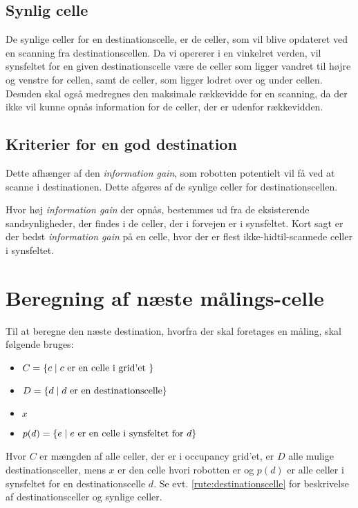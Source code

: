 \subsection{Synlig celle}\label{rute:synligcelle}
De synlige celler for en destinationscelle, er de celler, som vil blive opdateret ved en scanning fra destinationscellen.
Da vi opererer i en vinkelret verden, vil synsfeltet for en given destinationscelle være de celler som ligger vandret til højre og venstre for cellen, samt de celler, som ligger lodret over og under cellen.
Desuden skal også medregnes den maksimale rækkevidde for en scanning, da der ikke vil kunne opnås information for de celler, der er udenfor rækkevidden.

\subsection{Kriterier for en god destination}
Dette afhænger af den \textit{information gain}, som robotten potentielt vil få ved at scanne i destinationen.
Dette afgøres af de synlige celler for destinationscellen.

Hvor høj \textit{information gain} der opnås, bestemmes ud fra de eksisterende sandsynligheder, der findes i de celler, der i forvejen er i synsfeltet.
Kort sagt er der bedst \textit{information gain} på en celle, hvor der er flest ikke-hidtil-scannede celler i synsfeltet.

\section{Beregning af næste målings-celle}
Til at beregne den næste destination, hvorfra der skal foretages en måling, skal følgende bruges:
\begin{itemize}
\item{$C = \{ c \mid c \textnormal{ er en celle i grid'et } \}$}
\item{$D = \{ d \mid d \textnormal{ er en destinationscelle}\}$}
\item{$x$}
\item{$p(d) = \{ e \mid e \textnormal{ er en celle i synsfeltet for } d \}$}
\end{itemize}
Hvor $C$ er mængden af alle celler, der er i occupancy grid'et, er $D$ alle mulige destinationsceller, mens $x$ er den celle hvori robotten er og $p(d)$ er alle celler i synsfeltet for en destinationscelle $d$.
Se evt. \cref{rute:destinationscelle} for beskrivelse af destinationsceller og synlige celler.


